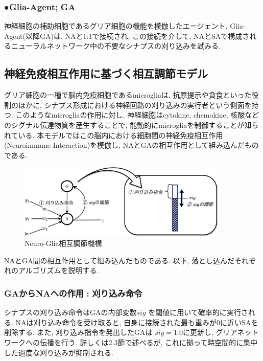 \documentclass[a4paper, 10.5pt,twocolumn,dvipdfmx]{jsarticle}
\begin{document}
  \subsubsection*{●Glia-Agent;\,\,GA}
  神経細胞の補助細胞であるグリア細胞の機能を模倣したエージェント. 
  Glia-Agent(以降GA)は, NAと1:1で接続され, この接続を介して, 
  NAとSAで構成されるニューラルネットワーク中の不要なシナプスの刈り込みを試みる.
  \vspace{2mm}
\subsection{神経免疫相互作用に基づく相互調節モデル}
グリア細胞の一種で脳内免疫細胞であるmicrogliaは, 抗原提示や貪食といった役割のほかに,  
シナプス形成における神経回路の刈り込みの実行者という側面を持つ. 
このようなmicrogliaの作用に対し, 
神経細胞はcytokine, chemokine, 核酸などのシグナル伝達物質を産生することで, 
能動的にmicrogliaを制御することが知られている. 
本モデルではこの脳内における細胞間の神経免疫相互作用(Neuroimmune Interaction)を模倣し,
NAとGAの相互作用として組み込んだものである.
\vspace{-1.5zh}
\begin{figure}[H]
  \centering
  \includegraphics[width=10cm]{NewDeal-crop.pdf}
  \caption{Neuro-Glia相互調節機構}
\end{figure}
NAとGA間の相互作用として組み込んだものである. 
以下, 落とし込んだそれぞれのアルゴリズムを説明する.
\vspace{2mm}
\subsubsection{GAからNAへの作用\,\,:\,\,刈り込み命令}
シナプスの刈り込み命令はGAの内部変数$sig$
を閾値に用いて確率的に実行される.
NAは刈り込み命令を受け取ると, 自身に接続された最も重みが0に近いSAを
削除する.
また, 刈り込み指令を発出したGAは
$sig=1.0$に更新し, グリアネットワークへの伝播を行う.
詳しくは2.3節で述べるが, これに拠って時空間的に集中した過度な刈り込みが抑制される.

\vspace{2mm}
\end{document}
